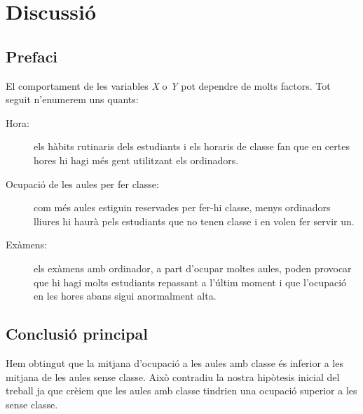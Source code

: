 \section{Discussió}
\subsection{Prefaci}
El comportament de les variables \emph{X} o \emph{Y} pot dependre de molts factors. Tot seguit n'enumerem uns quants:
\begin{description}
	\item[Hora:] els hàbits rutinaris dels estudiants i els horaris de classe fan que en certes hores hi hagi més gent utilitzant els ordinadors.
	\item[Ocupació de les aules per fer classe:] com més aules estiguin reservades per fer-hi classe, menys ordinadors lliures hi haurà pels estudiants que no tenen classe i en volen fer servir un.
	\item[Exàmens:] els exàmens amb ordinador, a part d'ocupar moltes aules, poden provocar que hi hagi molts estudiants repassant a l'últim moment i que l'ocupació en les hores abans sigui anormalment alta.
\end{description}

\subsection{Conclusió principal}
Hem obtingut que la mitjana d'ocupació a les aules amb classe és inferior a les mitjana de les aules sense classe. Això contradiu la nostra hipòtesis inicial del treball ja que crèiem que les aules amb classe tindrien una ocupació superior a les sense classe. 


